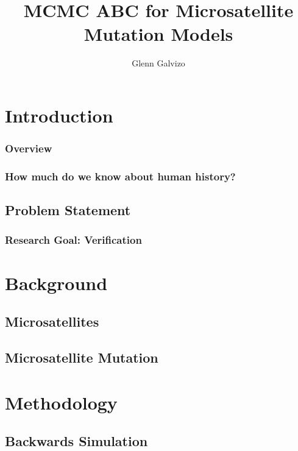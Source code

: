 \documentclass[11pt]{beamer}
\author{Glenn Galvizo}
\title{MCMC ABC for Microsatellite Mutation Models}
\institute{University of Hawaii at Manoa}
\begin{document}
    \begin{frame}
        \titlepage
    \end{frame}

	\section{Introduction}\label{sec:introduction}
	\begin{frame}
		\frametitle{Overview}
        \tableofcontents
	\end{frame}

	\begin{frame}
		\frametitle{How much do we know about human history?}
	\end{frame}

	\subsection{Problem Statement}\label{subsec:problemStatement}
	\begin{frame}
		\frametitle{Research Goal: Verification}
	\end{frame}

	\section{Background}\label{sec:background}
	\subsection{Microsatellites}\label{subsec:microsatellites}
    \begin{frame}

    \end{frame}

    \subsection{Microsatellite Mutation}\label{subsec:microsatelliteMutation}
    \begin{frame}
        
    \end{frame}

    \section{Methodology}\label{sec:methodology}
	\subsection{Backwards Simulation}\label{subsec:backwardsSimulation}
    \begin{frame}

    \end{frame}
\end{document}

